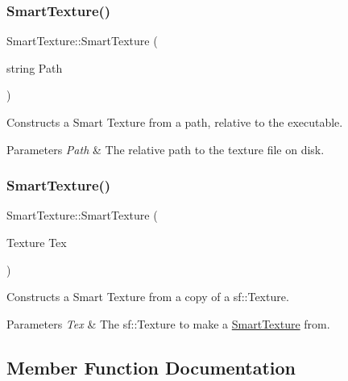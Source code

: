 \subsubsection{\texorpdfstring{Smart\+Texture()}{SmartTexture()}\hspace{0.1cm}{\footnotesize\ttfamily [1/2]}}
{\footnotesize\ttfamily Smart\+Texture\+::\+Smart\+Texture (\begin{DoxyParamCaption}\item[{string}]{Path }\end{DoxyParamCaption})\hspace{0.3cm}{\ttfamily [inline]}}



Constructs a Smart Texture from a path, relative to the executable. 


\begin{DoxyParams}{Parameters}
{\em Path} & The relative path to the texture file on disk.\\
\hline
\end{DoxyParams}
\mbox{\label{struct_smart_texture_a46ac388243d615cbd00feac8fcb0f7fc}} 
\subsubsection{\texorpdfstring{Smart\+Texture()}{SmartTexture()}\hspace{0.1cm}{\footnotesize\ttfamily [2/2]}}
{\footnotesize\ttfamily Smart\+Texture\+::\+Smart\+Texture (\begin{DoxyParamCaption}\item[{Texture}]{Tex }\end{DoxyParamCaption})\hspace{0.3cm}{\ttfamily [inline]}}



Constructs a Smart Texture from a copy of a sf\+::\+Texture. 


\begin{DoxyParams}{Parameters}
{\em Tex} & The sf\+::\+Texture to make a \hyperlink{struct_smart_texture}{Smart\+Texture} from.\\
\hline
\end{DoxyParams}


\subsection{Member Function Documentation}
\mbox{\label{struct_smart_texture_ae8e39d3a1b4b325c1da2d300ba623e17}} 
